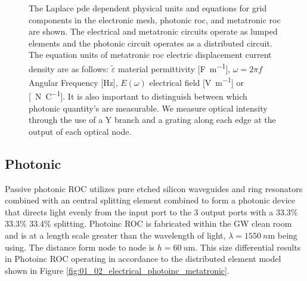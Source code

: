 \begin{figure}[ht]
\centering{}
\caption{The Laplace \acrshort{pde} dependent physical units and equations for grid components in the electronic mesh, photonic \acrshort{roc}, and metatronic \acrshort{roc} are shown. The electrical and metatronic circuits operate as lumped elements and the photonic circuit operates as a distributed circuit. The equation units of metatronic \acrshort{roc} electric displacement current density are as follows: $\tilde{\varepsilon}$ material permittivity [\si{\farad \meter^{-1}}], $\omega = 2\pi f$ Angular Frequency [\si{\hertz}], $E(\omega)$ electrical field [\si{\volt \meter^{-1}}] or [\SI{}{\newton \coulomb^{-1}}]. It is also important to distinguish between which photonic quantity's are measurable. We measure optical intensity through the use of a Y branch and a grating along each edge at the output of each optical node.}
\label{fig:01_02b_physics_table}
\end{figure}


\subsection{Photonic}

\par Passive photonic ROC utilizes pure etched silicon waveguides and ring resonators combined with an central splitting element combined to form a photonic device that directs light evenly from the input port to the 3 output ports with a 33.3\% 33.3\% 33.4\%  splitting. Photoinc ROC is fabricated within the GW clean room and is at a length scale greater than the wavelength of light, $\lambda = \SI{1550}{n\meter}$ being using. The distance form node to node is $h = \SI{60}{u\meter}$. This size differential results in Photoinc ROC operating in accordance to the \gls{distributed element model} shown in Figure \ref{fig:01_02_electrical_photoinc_metatronic}. 

